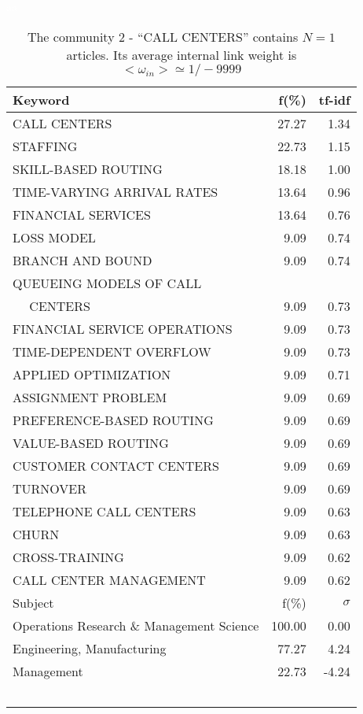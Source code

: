 \documentclass[a4paper,11pt]{report}
\begin{document}
\begin{landscape}
\clearpage

\begin{table}[!ht]
\caption{The community 2 - ``CALL CENTERS'' contains $N = 1$ articles. Its average internal link weight is $<\omega_{in}> \simeq 1/-9999$ }
\textcolor{white}{aa}\\
{\scriptsize\begin{tabular}{|l r  r|}
\hline
Keyword & f(\%) & tf-idf \\
\hline
CALL CENTERS & 27.27 & 1.34\\
STAFFING & 22.73 & 1.15\\
SKILL-BASED ROUTING & 18.18 & 1.00\\
TIME-VARYING ARRIVAL RATES & 13.64 & 0.96\\
FINANCIAL SERVICES & 13.64 & 0.76\\
LOSS MODEL & 9.09 & 0.74\\
BRANCH AND BOUND & 9.09 & 0.74\\
QUEUEING MODELS OF CALL &  &\\
$\quad$ CENTERS & 9.09 & 0.73\\
FINANCIAL SERVICE OPERATIONS & 9.09 & 0.73\\
TIME-DEPENDENT OVERFLOW & 9.09 & 0.73\\
APPLIED OPTIMIZATION & 9.09 & 0.71\\
ASSIGNMENT PROBLEM & 9.09 & 0.69\\
PREFERENCE-BASED ROUTING & 9.09 & 0.69\\
VALUE-BASED ROUTING & 9.09 & 0.69\\
CUSTOMER CONTACT CENTERS & 9.09 & 0.69\\
TURNOVER & 9.09 & 0.69\\
TELEPHONE CALL CENTERS & 9.09 & 0.63\\
CHURN & 9.09 & 0.63\\
CROSS-TRAINING & 9.09 & 0.62\\
CALL CENTER MANAGEMENT & 9.09 & 0.62\\
\hline
\hline
Subject & f(\%) & $\sigma$\\
\hline
Operations Research \& Management Science & 100.00 & 0.00\\
Engineering, Manufacturing & 77.27 & 4.24\\
Management & 22.73 & -4.24\\
 &  & \\
 &  & \\
 &  & \\
 &  & \\
 &  & \\

\end{tabular}}
\end{table}
\end{landscape}
\end{document}
